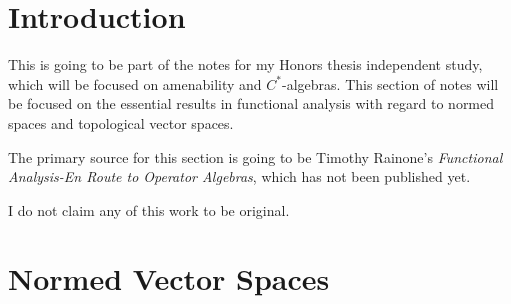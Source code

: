 \documentclass[10pt]{mypackage}
\begin{document}
\RaggedRight
\tableofcontents
\section{Introduction}%
This is going to be part of the notes for my Honors thesis independent study, which will be focused on amenability and $C^{\ast}$-algebras. This section of notes will be focused on the essential results in functional analysis with regard to normed spaces and topological vector spaces.\newline

The primary source for this section is going to be Timothy Rainone's \textit{Functional Analysis-En Route to Operator Algebras}, which has not been published yet.\newline

I do not claim any of this work to be original.
\section{Normed Vector Spaces}%
\end{document}
